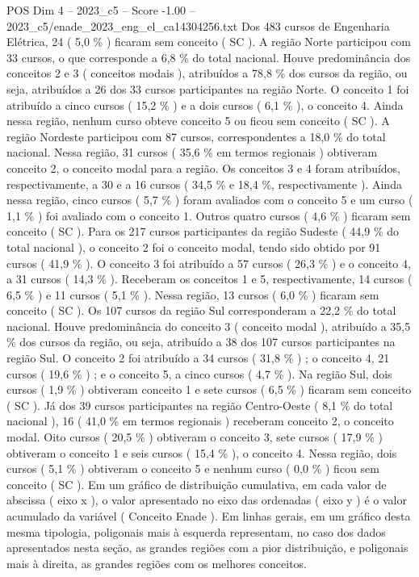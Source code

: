 \begin{textsample}{POS Dim 4 – 2023\_c5 – Score -1.00 – 2023\_c5/enade\_2023\_eng\_el\_ca14304256.txt}
Dos 483 cursos de Engenharia Elétrica, 24 ( 5,0 \% ) ficaram sem conceito ( SC ).
A região Norte participou com 33 cursos, o que corresponde a 6,8 \% do total nacional.
Houve predominância dos conceitos 2 e 3 ( conceitos modais ), atribuídos a 78,8 \% dos cursos da região, ou seja, atribuídos a 26 dos 33 cursos participantes na região Norte.
O conceito 1 foi atribuído a cinco cursos ( 15,2 \% ) e a dois cursos ( 6,1 \% ), o conceito 4.
Ainda nessa região, nenhum curso obteve conceito 5 ou ficou sem conceito ( SC ).
A região Nordeste participou com 87 cursos, correspondentes a 18,0 \% do total nacional.
Nessa região, 31 cursos ( 35,6 \% em termos regionais ) obtiveram conceito 2, o conceito modal para a região.
Os conceitos 3 e 4 foram atribuídos, respectivamente, a 30 e a 16 cursos ( 34,5 \% e 18,4 \%, respectivamente ).
Ainda nessa região, cinco cursos ( 5,7 \% ) foram avaliados com o conceito 5 e um curso ( 1,1 \% ) foi avaliado com o conceito 1.
Outros quatro cursos ( 4,6 \% ) ficaram sem conceito ( SC ).
Para os 217 cursos participantes da região Sudeste ( 44,9 \% do total nacional ), o conceito 2 foi o conceito modal, tendo sido obtido por 91 cursos ( 41,9 \% ).
O conceito 3 foi atribuído a 57 cursos ( 26,3 \% ) e o conceito 4, a 31 cursos ( 14,3 \% ).
Receberam os conceitos 1 e 5, respectivamente, 14 cursos ( 6,5 \% ) e 11 cursos ( 5,1 \% ).
Nessa região, 13 cursos ( 6,0 \% ) ficaram sem conceito ( SC ).
Os 107 cursos da região Sul corresponderam a 22,2 \% do total nacional.
Houve predominância do conceito 3 ( conceito modal ), atribuído a 35,5 \% dos cursos da região, ou seja, atribuído a 38 dos 107 cursos participantes na região Sul.
O conceito 2 foi atribuído a 34 cursos ( 31,8 \% ) ; o conceito 4, 21 cursos ( 19,6 \% ) ; e o conceito 5, a cinco cursos ( 4,7 \% ).
Na região Sul, dois cursos ( 1,9 \% ) obtiveram conceito 1 e sete cursos ( 6,5 \% ) ficaram sem conceito ( SC ).
Já dos 39 cursos participantes na região Centro-Oeste ( 8,1 \% do total nacional ), 16 ( 41,0 \% em termos regionais ) receberam conceito 2, o conceito modal.
Oito cursos ( 20,5 \% ) obtiveram o conceito 3, sete cursos ( 17,9 \% ) obtiveram o conceito 1 e seis cursos ( 15,4 \% ), o conceito 4.
Nessa região, dois cursos ( 5,1 \% ) obtiveram o conceito 5 e nenhum curso ( 0,0 \% ) ficou sem conceito ( SC ).
Em um gráfico de distribuição cumulativa, em cada valor de abscissa ( eixo x ), o valor apresentado no eixo das ordenadas ( eixo y ) é o valor acumulado da variável ( Conceito Enade ).
Em linhas gerais, em um gráfico desta mesma tipologia, poligonais mais à esquerda representam, no caso dos dados apresentados nesta seção, as grandes regiões com a pior distribuição, e poligonais mais à direita, as grandes regiões com os melhores conceitos.

\end{textsample}
